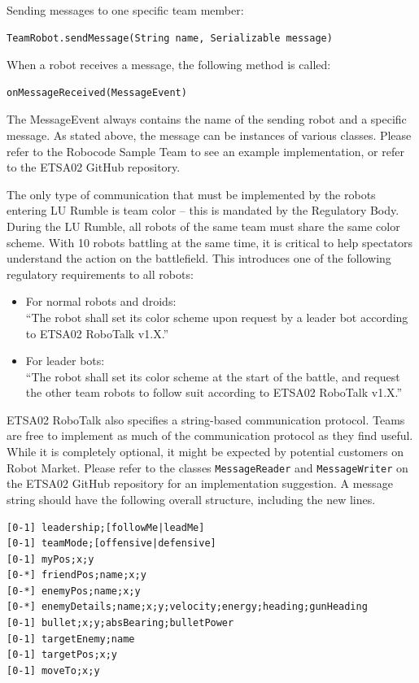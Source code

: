 \documentclass{scrreprt}
\begin{document}
Sending messages to one specific team member:
\begin{verbatim}
TeamRobot.sendMessage(String name, Serializable message)
\end{verbatim}

When a robot receives a message, the following method is called:
\begin{verbatim}
onMessageReceived(MessageEvent)
\end{verbatim}

The MessageEvent always contains the name of the sending robot and a specific message. As stated above, the message can be instances of various classes. Please refer to the Robocode Sample Team to see an example implementation, or refer to the ETSA02 GitHub repository.

The only type of communication that must be implemented by the robots entering LU Rumble is team color -- this is mandated by the Regulatory Body. During the LU Rumble, all robots of the same team must share the same color scheme. With 10 robots battling at the same time, it is critical to help spectators understand the action on the battlefield. This introduces one of the following regulatory requirements to all robots: 

\begin{itemize}
\item For normal robots and droids:\\``The robot shall set its color scheme upon request by a leader bot according to ETSA02 RoboTalk v1.X.''
\item For leader bots:\\``The robot shall set its color scheme at the start of the battle, and request the other team robots to follow suit according to ETSA02 RoboTalk v1.X.''
\end{itemize}

ETSA02 RoboTalk also specifies a string-based communication protocol. Teams are free to implement as much of the communication protocol as they find useful. While it is completely optional, it might be expected by potential customers on Robot Market. Please refer to the classes \texttt{MessageReader} and \texttt{MessageWriter} on the ETSA02 GitHub repository for an implementation suggestion. A message string should have the following overall structure, including the new lines.

\begin{verbatim}
[0-1] leadership;[followMe|leadMe]
[0-1] teamMode;[offensive|defensive]
[0-1] myPos;x;y
[0-*] friendPos;name;x;y
[0-*] enemyPos;name;x;y
[0-*] enemyDetails;name;x;y;velocity;energy;heading;gunHeading
[0-1] bullet;x;y;absBearing;bulletPower
[0-1] targetEnemy;name
[0-1] targetPos;x;y
[0-1] moveTo;x;y
\end{verbatim}
\end{document}
